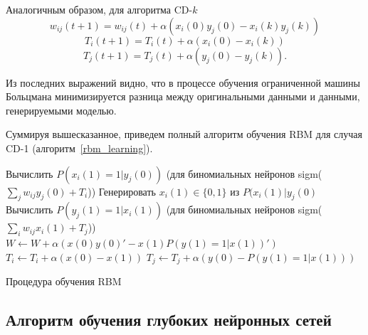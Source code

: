 Аналогичным образом, для алгоритма  CD-$k$
\begin{equation*}
	w_{ij}(t+1)=w_{ij}(t)+\alpha(x_i(0)y_j(0)-x_i(k)y_j(k))
\end{equation*} 
\begin{equation*}	
	T_i(t+1)=T_i(t)+\alpha(x_i(0)-x_i(k))
\end{equation*} 
\begin{equation*}		
	T_j(t+1)=T_j(t)+\alpha(y_j(0)-y_j(k)).
\end{equation*} 

Из последних выражений видно, что в процессе обучения ограниченной машины Больцмана минимизируется разница между оригинальными данными и данными, генерируемыми моделью.

Суммируя вышесказанное, приведем полный алгоритм обучения RBM для случая CD-1 (алгоритм~\ref{rbm_learning}).

\begin{algorithm}
	\SetAlgoLined
	
	{
		Вычислить $P(x_{i}(1)=1|y_j(0))$ (для биномиальных нейронов sigm($\sum_{j}{w_{ij}y_{j}(0)} + T_i$))\;
		Генерировать $x_{i}(1) \in \{0, 1\}$ из $P(x_{i}(1)|y_j(0)$\;
	}	
	{
		Вычислить $P(y_{j}(1)=1|x_i(1))$ (для биномиальных нейронов sigm($\sum_{i}{w_{ij}x_{i}(1)} + T_j$))\;
	}
	$W \leftarrow W + \alpha(x(0)y(0)' - x(1)P(y(1)=1|x(1))')$\;
	$T_i \leftarrow T_i + \alpha(x(0) - x(1))$\;
	$T_j \leftarrow T_j + \alpha(y(0) - P(y(1)=1|x(1)))$\;
	\caption{Процедура обучения RBM}
	\label{rbm_learning}
\end{algorithm}

\subsection{Алгоритм обучения глубоких нейронных сетей} \label{subsect1_3_2}

